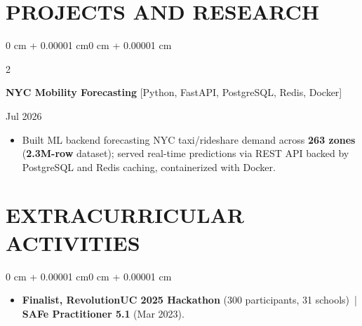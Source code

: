 \documentclass[10pt, letterpaper]{article}
\newenvironment{highlights}{
    \begin{itemize}[
        topsep=0.10 cm,
        parsep=0.06 cm,
        partopsep=0pt,
        itemsep=0.06 cm,
        leftmargin=12pt
    ]
}{
    \end{itemize}
}
\newenvironment{onecolentry}{
    \begin{adjustwidth}{0 cm + 0.00001 cm}{0 cm + 0.00001 cm}
}{
    \end{adjustwidth}
}
\newenvironment{twocolentry}[2][]{
    \onecolentry
    \def\secondColumn{#2}
    \setcolumnwidth{\fill, 4.5 cm}
    \begin{paracol}{2}
}{
    \switchcolumn \raggedleft \secondColumn
    \end{paracol}
    \endonecolentry
}
\begin{document}
\section{PROJECTS AND RESEARCH}
\begin{twocolentry}{Jul 2026}
\textbf{NYC Mobility Forecasting} [Python, FastAPI, PostgreSQL, Redis, Docker]
\end{twocolentry}
\begin{highlights}
  \item Built ML backend forecasting NYC taxi/rideshare demand across \textbf{263 zones} (\textbf{2.3M-row} dataset); served real-time predictions via REST API backed by PostgreSQL and Redis caching, containerized with Docker.
\end{highlights}

\vspace{0.12 cm}

\section{EXTRACURRICULAR ACTIVITIES}
\begin{onecolentry}
\begin{highlights}
  \item \textbf{Finalist, RevolutionUC 2025 Hackathon} (300 participants, 31 schools) \,|\, \textbf{SAFe Practitioner 5.1} (Mar 2023).
\end{highlights}
\end{onecolentry}
\end{document}
